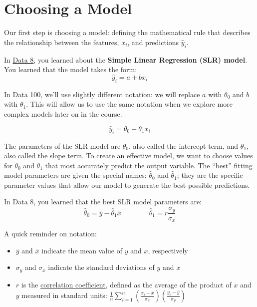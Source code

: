 \documentclass[
  letterpaper,
  DIV=11,
  numbers=noendperiod]{scrreprt}
\providecommand{\tightlist}{%
  \setlength{\itemsep}{0pt}\setlength{\parskip}{0pt}}\usepackage{longtable,booktabs,array}
\begin{document}
\section{Choosing a Model}\label{choosing-a-model}

Our first step is choosing a model: defining the mathematical rule that
describes the relationship between the features, \(x_i\), and
predictions \(\hat{y}_i\).

In
\href{https://inferentialthinking.com/chapters/15/4/Least_Squares_Regression.html}{Data
8}, you learned about the \textbf{Simple Linear Regression (SLR) model}.
You learned that the model takes the form: \[\hat{y}_i = a + bx_i\]

In Data 100, we'll use slightly different notation: we will replace
\(a\) with \(\theta_0\) and \(b\) with \(\theta_1\). This will allow us
to use the same notation when we explore more complex models later on in
the course.

\[\hat{y}_i = \theta_0 + \theta_1 x_i\]

The parameters of the SLR model are \(\theta_0\), also called the
intercept term, and \(\theta_1\), also called the slope term. To create
an effective model, we want to choose values for \(\theta_0\) and
\(\theta_1\) that most accurately predict the output variable. The
``best'' fitting model parameters are given the special names:
\(\hat{\theta}_0\) and \(\hat{\theta}_1\); they are the specific
parameter values that allow our model to generate the best possible
predictions.

In Data 8, you learned that the best SLR model parameters are:
\[\hat{\theta}_0 = \bar{y} - \hat{\theta}_1\bar{x} \qquad \qquad \hat{\theta}_1 = r \frac{\sigma_y}{\sigma_x}\]

A quick reminder on notation:

\begin{itemize}
\tightlist
\item
  \(\bar{y}\) and \(\bar{x}\) indicate the mean value of \(y\) and
  \(x\), respectively
\item
  \(\sigma_y\) and \(\sigma_x\) indicate the standard deviations of
  \(y\) and \(x\)
\item
  \(r\) is the
  \href{https://inferentialthinking.com/chapters/15/1/Correlation.html\#the-correlation-coefficient}{correlation
  coefficient}, defined as the average of the product of \(x\) and \(y\)
  measured in standard units:
  \(\frac{1}{n} \sum_{i=1}^n (\frac{x_i-\bar{x}}{\sigma_x})(\frac{y_i-\bar{y}}{\sigma_y})\)
\end{itemize}
\end{document}
